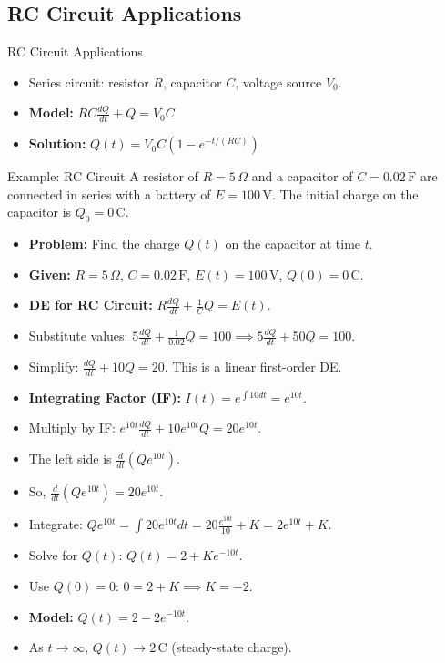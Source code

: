 \documentclass[10pt,aspectratio=169]{beamer}
\begin{document}
\subsection{RC Circuit Applications}
\begin{frame}{RC Circuit Applications}
    \begin{itemize}
        \item Series circuit: resistor $R$, capacitor $C$, voltage source $V_0$.
        \item \textbf{Model:} $RC\frac{dQ}{dt} + Q = V_0C$
        \item \textbf{Solution:} $Q(t) = V_0C(1 - e^{-t/(RC)})$
    \end{itemize}
\end{frame}

\begin{frame}{Example: RC Circuit}
    A resistor of $R=5\,\Omega$ and a capacitor of $C=0.02\,\mathrm{F}$ are connected in series with a battery of $E=100\,\mathrm{V}$. The initial charge on the capacitor is $Q_0 = 0\,\mathrm{C}$.
    \begin{itemize}
        \item \textbf{Problem:} Find the charge $Q(t)$ on the capacitor at time $t$.
        \item \textbf{Given:} $R=5\,\Omega$, $C=0.02\,\mathrm{F}$, $E(t)=100\,\mathrm{V}$, $Q(0)=0\,\mathrm{C}$.
        \item \textbf{DE for RC Circuit:} $R\frac{dQ}{dt} + \frac{1}{C}Q = E(t)$.
        \item Substitute values: $5\frac{dQ}{dt} + \frac{1}{0.02}Q = 100 \implies 5\frac{dQ}{dt} + 50Q = 100$.
        \item Simplify: $\frac{dQ}{dt} + 10Q = 20$. This is a linear first-order DE.
        \item \textbf{Integrating Factor (IF):} $I(t) = e^{\int 10 dt} = e^{10t}$.
        \item Multiply by IF: $e^{10t}\frac{dQ}{dt} + 10e^{10t}Q = 20e^{10t}$.
        \item The left side is $\frac{d}{dt}(Qe^{10t})$.
        \item So, $\frac{d}{dt}(Qe^{10t}) = 20e^{10t}$.
        \item Integrate: $Qe^{10t} = \int 20e^{10t} dt = 20 \frac{e^{10t}}{10} + K = 2e^{10t} + K$.
        \item Solve for $Q(t)$: $Q(t) = 2 + Ke^{-10t}$.
        \item Use $Q(0)=0$: $0 = 2 + K \implies K = -2$.
        \item \textbf{Model:} $Q(t) = 2 - 2e^{-10t}$.
        \item As $t \to \infty$, $Q(t) \to 2\,\mathrm{C}$ (steady-state charge).
    \end{itemize}
\end{frame}
\end{document}
